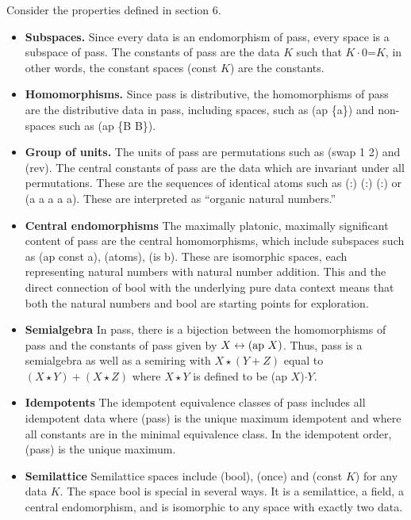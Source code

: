 \documentclass[11pt]{article}
\begin{document}
Consider the properties defined in section 6.  
\begin{itemize}
\item{{\bf Subspaces.}  Since every data is an endomorphism of pass, every space is a subspace of pass.  The constants of pass are the data $K$ such that 
$K\cdot 0$=$K$, in other words, the constant spaces (const $K$) are the constants.}
\item{{\bf Homomorphisms.} Since pass is distributive, the homomorphisms of pass are the distributive data in pass, including spaces, such as (ap \{a\}) 
and non-spaces such as (ap \{B B\}).} 
\item{{\bf Group of units.} The units of pass are permutations such as (swap 1 2) and (rev).  The central constants of pass are the data which 
are invariant under all permutations.  These are the sequences of identical atoms such as (:) (:) (:) or (a a a a a).  These are interpreted as ``organic natural numbers.''}
\item{{\bf Central endomorphisms} The maximally platonic, maximally significant content of pass are the central homomorphisms, which include 
subspaces such as (ap const a), (atoms), (is b).  These are isomorphic spaces, each representing natural numbers with natural number 
addition.  This and the direct connection of bool with the underlying pure data context means that 
both the natural numbers and bool are starting points for exploration.} 
\item{{\bf Semialgebra} In pass, there is a bijection between the homomorphisms of pass and the constants of pass given by $X\leftrightarrow ({\rm ap}\ X)$.  Thus,
pass is a semialgebra as well as a semiring with $X\star (Y+Z)$ equal to $(X\star Y)+(X\star Z)$ where $X\star Y$ is defined to be (ap $X$)$\cdot Y$.}
\item{{\bf Idempotents} The idempotent equivalence classes of pass includes all idempotent data where (pass) is the unique maximum idempotent and where all constants are in the minimal equivalence class.  In the idempotent order, (pass) is the unique maximum.}
\item{{\bf Semilattice} Semilattice spaces include (bool), (once) and (const $K$) for any data $K$.  The space bool is special in several ways.  
It is a semilattice, a field, a central endomorphism, and is isomorphic to any space with exactly two data.}
\end{itemize}
\end{document}
